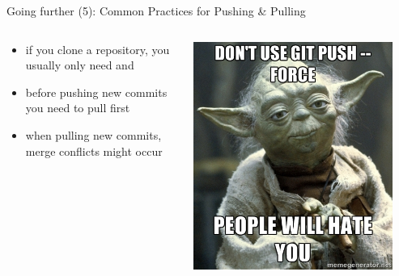 \begin{frame}{Going further (5): Common Practices for Pushing \& Pulling}
  \begin{columns}[onlytextwidth]
    \begin{column}{0.7\textwidth}
      \begin{itemize}
        \item if you clone a repository, you usually only need  and 
        \item before pushing new commits you need to pull first
        \item when pulling new commits, merge conflicts might occur
      \end{itemize}
    \end{column}
    \begin{column}{0.3\textwidth}
      \includegraphics[width=0.9\textwidth]{imgs/no_force}
    \end{column}
  \end{columns}
\end{frame}

